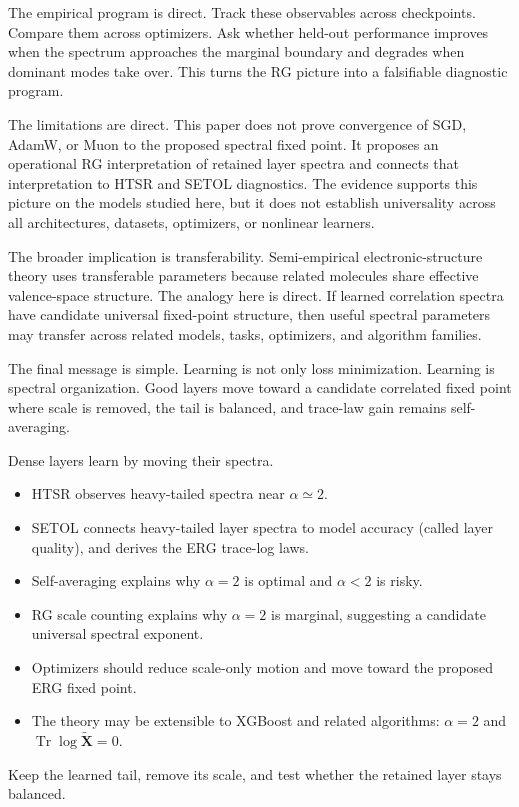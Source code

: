 \documentclass[10pt,twocolumn]{article}
\newcommand{\Tr}{\operatorname{Tr}}
\newcommand{\takeaway}[1]{%
  \par\vspace{4pt}\noindent\textcolor{boxblue}{#1}%
}
\begin{document}
The empirical program is direct. Track these observables across checkpoints. Compare them across optimizers. Ask whether held-out performance improves when the spectrum approaches the marginal boundary and degrades when dominant modes take over. This turns the RG picture into a falsifiable diagnostic program.

The limitations are direct. This paper does not prove convergence of SGD, AdamW, or Muon to the proposed spectral fixed point. It proposes an operational RG interpretation of retained layer spectra and connects that interpretation to HTSR and SETOL diagnostics. The evidence supports this picture on the models studied here, but it does not establish universality across all architectures, datasets, optimizers, or nonlinear learners.

The broader implication is transferability. Semi-empirical electronic-structure theory uses transferable parameters because related molecules share effective valence-space structure. The analogy here is direct. If learned correlation spectra have candidate universal fixed-point structure, then useful spectral parameters may transfer across related models, tasks, optimizers, and algorithm families.

The final message is simple. Learning is not only loss minimization. Learning is spectral organization. Good layers move toward a candidate correlated fixed point where scale is removed, the tail is balanced, and trace-law gain remains self-averaging.


\begin{tcolorbox}[marginalbox,title=\textbf{17. The theory in one pass}]
Dense layers learn by moving their spectra.
\begin{itemize}
\item HTSR observes heavy-tailed spectra near $\alpha\simeq2$.
\item SETOL connects heavy-tailed layer spectra to model accuracy (called layer quality), and derives the ERG trace-log laws.
\item Self-averaging explains why $\alpha=2$ is optimal and $\alpha<2$ is risky.
\item RG scale counting explains why $\alpha=2$ is marginal, suggesting a candidate universal spectral exponent.
\item Optimizers should reduce scale-only motion and move toward the proposed ERG fixed point.
\item The theory may be extensible to XGBoost and related algorithms:
  $\alpha=2$  and $\Tr{\log\tilde{\mathbf{X}}}=0$.
\end{itemize}
\takeaway{Keep the learned tail, remove its scale, and test whether the retained layer stays balanced.}
\end{tcolorbox}
\end{document}

